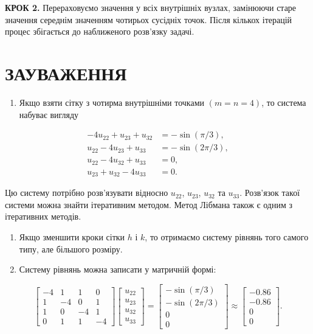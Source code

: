 \documentclass[
  ukrainian,
]{article}
\providecommand{\tightlist}{%
  \setlength{\itemsep}{0pt}\setlength{\parskip}{0pt}}
\begin{document}
\textbf{КРОК 2.} Перераховуємо значення у всіх внутрішніх вузлах,
замінюючи старе значення середнім значенням чотирьох сусідніх точок.
Після кількох ітерацій процес збігається до наближеного розв'язку
задачі.

\section{ЗАУВАЖЕННЯ}\label{ux437ux430ux443ux432ux430ux436ux435ux43dux43dux44f-12}

\begin{enumerate}
\def\labelenumi{\arabic{enumi}.}
\tightlist
\item
  Якщо взяти сітку з чотирма внутрішніми точками \((m=n=4)\), то система
  набуває вигляду
\end{enumerate}

\[
\begin{aligned}-4u_{22} + u_{23} + u_{32} &= -\sin(\pi/3),\\u_{22} - 4u_{23} + u_{33} &= -\sin(2\pi/3),\\u_{22} - 4u_{32} + u_{33} &= 0,\\u_{23} + u_{32} - 4u_{33} &= 0.\end{aligned}
\]

Цю систему потрібно розв'язувати відносно \(u_{22}\), \(u_{23}\),
\(u_{32}\) та \(u_{33}\). Розв'язок такої системи можна знайти
ітеративним методом. Метод Лібмана також є одним з ітеративних методів.

\begin{enumerate}
\def\labelenumi{\arabic{enumi}.}
\setcounter{enumi}{1}
\item
  Якщо зменшити кроки сітки \(h\) і \(k\), то отримаємо систему рівнянь
  того самого типу, але більшого розміру.
\item
  Систему рівнянь можна записати у матричній формі:
\end{enumerate}

\[
\begin{bmatrix}-4 & 1 & 1 & 0 \\1 & -4 & 0 & 1 \\1 & 0 & -4 & 1 \\0 & 1 & 1 & -4\end{bmatrix}\begin{bmatrix}u_{22}\\u_{23}\\u_{32}\\u_{33}\end{bmatrix}=\begin{bmatrix}-\sin(\pi/3)\\-\sin(2\pi/3)\\0\\0\end{bmatrix}\approx\begin{bmatrix}-0.86\\-0.86\\0\\0\end{bmatrix}.
\]
\end{document}
